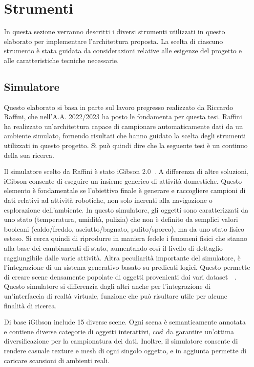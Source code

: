 \documentclass[12pt]{report}
\begin{document}
\section{Strumenti}
\label{chap:strumenti}

In questa sezione verranno descritti i diversi strumenti utilizzati in questo elaborato per implementare l'architettura proposta. La scelta di ciascuno strumento è stata guidata da considerazioni relative alle esigenze del progetto e alle caratteristiche tecniche necessarie.

\subsection{Simulatore}
\label{chap:simulatore}

Questo elaborato si basa in parte sul lavoro pregresso realizzato da Riccardo Raffini, che nell'A.A. 2022/2023 ha posto le fondamenta per questa tesi. Raffini ha realizzato un'architettura capace di campionare automaticamente dati da un ambiente simulato, fornendo risultati che hanno guidato la scelta degli strumenti utilizzati in questo progetto. Si può quindi dire che la seguente tesi è un continuo della sua ricerca.

Il simulatore scelto da Raffini è stato iGibson 2.0~\cite{li2021igibson}. A differenza di altre soluzioni, iGibson consente di eseguire un insieme generico di attività domestiche. Questo elemento è fondamentale se l'obiettivo finale è generare e raccogliere campioni di dati relativi ad attività robotiche, non solo inerenti alla navigazione o esplorazione dell'ambiente. In questo simulatore, gli oggetti sono caratterizzati da uno stato (temperatura, umidità, pulizia) che non è definito da semplici valori booleani (caldo/freddo, asciutto/bagnato, pulito/sporco), ma da uno stato fisico esteso. Si cerca quindi di riprodurre in maniera fedele i fenomeni fisici che stanno alla base dei cambiamenti di stato, aumentando così il livello di dettaglio raggiungibile dalle varie attività. Altra peculiarità importante del simulatore, è l'integrazione di un sistema generativo basato su predicati logici. Questo permette di creare scene densamente popolate di oggetti provenienti dai vari dataset~\cite{doi:10.1177/0278364919844314}~\cite{pmlr-v164-srivastava22a}. Questo simulatore si differenzia dagli altri anche per l'integrazione di un'interfaccia di realtà virtuale, funzione che può risultare utile per alcune finalità di ricerca.

Di base iGibson include 15 diverse scene. Ogni scena è semanticamente annotata e contiene diverse categorie di oggetti interattivi, così da garantire un'ottima diversificazione per la campionatura dei dati. Inoltre, il simulatore consente di rendere casuale texture e mesh di ogni singolo oggetto, e in aggiunta permette di caricare scansioni di ambienti reali.
\end{document}
